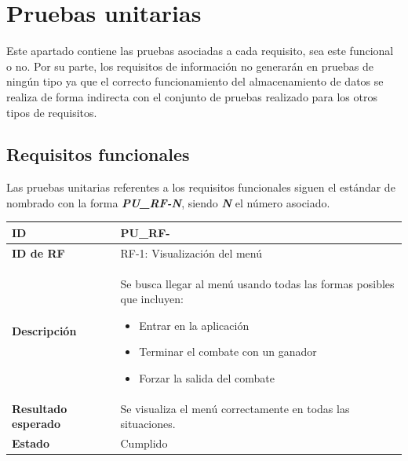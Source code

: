 \section{Pruebas unitarias}

Este apartado contiene las pruebas asociadas a cada requisito, sea este funcional o no. Por su parte, los requisitos de información no generarán en pruebas de ningún tipo ya que el correcto funcionamiento del almacenamiento de datos se realiza de forma indirecta con el conjunto de pruebas realizado para los otros tipos de requisitos.

\subsection{Requisitos funcionales}

Las pruebas unitarias referentes a los requisitos funcionales siguen el estándar de nombrado con la forma \textit{\textbf{PU\_RF-N}}, siendo \textbf{\textit{N}} el número asociado.

\setcounter{contador_pruebas_funcionales}{1}

\begin{center}
	\begin{tabular}{ | p{3cm} | p{10cm} | } 
		\hline
		
		\textbf{ID} & PU\_RF-\arabic{contador_pruebas_funcionales}
		{contador_pruebas_funcionales} \\
		
		\hline 
		\textbf{ID de RF} &
		RF-1: Visualización del menú\\ 
		
		\hline
		\textbf{Descripción} & 
		Se busca llegar al menú usando todas las formas posibles que incluyen:
		\begin{itemize}
			\item Entrar en la aplicación
			\item Terminar el combate con un ganador
			\item Forzar la salida del combate 
		\end{itemize}\\
		
		\hline 
		\textbf{Resultado esperado} &
		Se visualiza el menú correctamente en todas las situaciones.\\ 
		
		\hline 
		\textbf{Estado} &
		Cumplido\\ 
		
		\hline
	\end{tabular}
\end{center}

